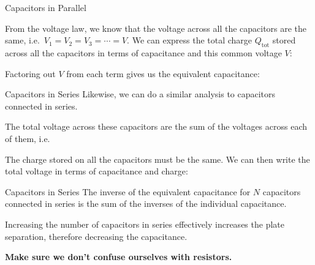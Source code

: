 \documentclass[12pt,aspectratio=169]{beamer}
\begin{document}
\begin{frame}{Capacitors in Parallel}
  \begin{center}
  \end{center}
  From the voltage law, we know that the voltage across all the capacitors are
  the same, i.e.\ $V_1=V_2=V_3=\cdots=V$. We can express the total charge
  $Q_\text{tot}$ stored across all the capacitors in terms of capacitance and
  this common voltage $V$: 

  
  \vspace{-.1in}Factoring out $V$ from each term gives us the equivalent
  capacitance:

\end{frame}



\begin{frame}{Capacitors in Series}
  Likewise, we can do a similar analysis to capacitors connected in series.
  \begin{center}
  \end{center}
  The total voltage across these capacitors are the sum of the voltages across
  each of them, i.e.\

  
  \vspace{-.1in}The charge stored on all the capacitors must be the same. We
  can then write the total voltage in terms of capacitance and charge:

\end{frame}




\begin{frame}{Capacitors in Series}
  The inverse of the equivalent capacitance for $N$ capacitors connected in
  series is the sum of the inverses of the individual capacitance.


  Increasing the number of capacitors in series effectively increases the
  plate separation, therefore decreasing the capacitance.
  
  \vspace{.1in}\textbf{Make sure we don't confuse ourselves with resistors.}
\end{frame}
\end{document}
